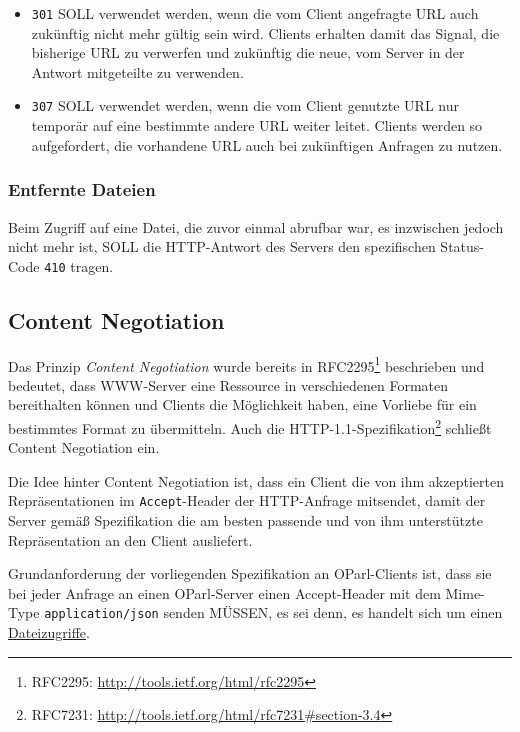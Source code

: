 \documentclass[,a4paper]{article}
\begin{document}
\begin{itemize}
\item
  \texttt{301} SOLL verwendet werden, wenn die vom Client angefragte URL
  auch zukünftig nicht mehr gültig sein wird. Clients erhalten damit das
  Signal, die bisherige URL zu verwerfen und zukünftig die neue, vom
  Server in der Antwort mitgeteilte zu verwenden.
\item
  \texttt{307} SOLL verwendet werden, wenn die vom Client genutzte URL
  nur temporär auf eine bestimmte andere URL weiter leitet. Clients
  werden so aufgefordert, die vorhandene URL auch bei zukünftigen
  Anfragen zu nutzen.
\end{itemize}

\subsubsection{Entfernte Dateien}\label{entfernte-dateien}

Beim Zugriff auf eine Datei, die zuvor einmal abrufbar war, es
inzwischen jedoch nicht mehr ist, SOLL die HTTP-Antwort des Servers den
spezifischen Status-Code \texttt{410} tragen.

\subsection{Content Negotiation}\label{contentux5fnegotiation}

Das Prinzip \emph{Content Negotiation} wurde bereits in
RFC2295\footnote{RFC2295: \url{http://tools.ietf.org/html/rfc2295}}
beschrieben und bedeutet, dass WWW-Server eine Ressource in
verschiedenen Formaten bereithalten können und Clients die Möglichkeit
haben, eine Vorliebe für ein bestimmtes Format zu übermitteln. Auch die
HTTP-1.1-Spezifikation\footnote{RFC7231:
  \url{http://tools.ietf.org/html/rfc7231\#section-3.4}} schließt
Content Negotiation ein.

Die Idee hinter Content Negotiation ist, dass ein Client die von ihm
akzeptierten Repräsentationen im \texttt{Accept}-Header der HTTP-Anfrage
mitsendet, damit der Server gemäß Spezifikation die am besten passende
und von ihm unterstützte Repräsentation an den Client ausliefert.

Grundanforderung der vorliegenden Spezifikation an OParl-Clients ist,
dass sie bei jeder Anfrage an einen OParl-Server einen Accept-Header mit
dem Mime-Type \texttt{application/json} senden MÜSSEN, es sei denn, es
handelt sich um einen \hyperref[dateizugriff]{Dateizugriffe}.
\end{document}
